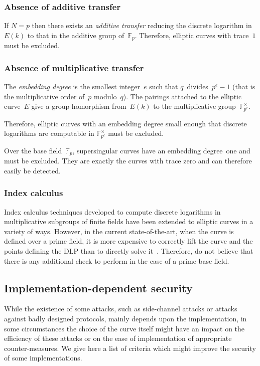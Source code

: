 \documentclass[twocolumn,letterpaper,10pt]{article}
\def\F{\mathbb{F}}
\begin{document}
\subsubsection{Absence of additive transfer}
\label{sss:anomalous}

If $N = p$ then there exists an \emph{additive transfer}
reducing the discrete logarithm in~$E(k)$
to that in the additive group of~$\F_p$.
Therefore, elliptic curves with trace~$1$ must be excluded.

\subsubsection{Absence of multiplicative transfer}
\label{sss:embedding-degree}

The \emph{embedding degree} is the smallest integer~$e$ such that
$q$~divides~$p^e -1$
(that is the multiplicative order of~$p$ modulo~$q$).
The pairings attached to the elliptic curve~$E$
give a group homorphism from~$E(k)$
to the multiplicative group~$\F_{p^e}^{×}$.

Therefore, elliptic curves with an embedding degree small enough
that discrete logarithms are computable in $\F_{p^e}^{×}$
must be excluded.

Over the base field~$\F_p$, supersingular curves
have an embedding degree~one and must be excluded.
They are exactly the curves with trace zero
and can therefore easily be detected.

\subsubsection{Index calculus}

Index calculus techniques developed to compute discrete logarithms
in multiplicative subgroups of finite fields
have been extended to elliptic curves in a variety of ways.
However, in the current state-of-the-art, when the curve is defined over
a prime field, it is more expensive
to correctly lift the curve and the points defining the DLP than
to directly solve it~\cite{asia1998ss,dcc2000silverman,dcc2000ksst,ecc2007silverman,sac2008silverman}.
Therefore, do not believe that there is any additional check to perform
in the case of a prime base field.

\subsection{Implementation-dependent security}
\label{ss:side}

While the existence of some attacks,
such as side-channel attacks or attacks against badly designed protocols,
mainly depends upon the implementation,
in some circumstances the choice of the curve itself
might have an impact on the efficiency of these attacks
or on the ease of implementation of appropriate counter-measures.
We give here a list of criteria
which might improve the security
of some implementations.
\end{document}
